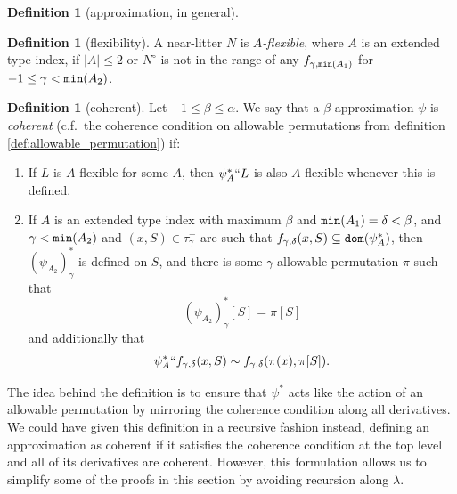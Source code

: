 \documentclass{article}
\theoremstyle{definition}
\newtheorem{definition}[theorem]{Definition}
\theoremstyle{remark}
\begin{document}
{\begin{definition}[approximation, in general]
\begin{enumerate}
  \end{enumerate}
\end{definition}
\begin{definition}[flexibility]\label{def:flexible}
  A near-litter $N$ is {\em  $A$-flexible\/}, where $A$ is an extended type index,  if $|A| \leq 2$ or $N^\circ$ is not in the range of any $f_{\gamma,{\tt min}(A_1)}$
for $-1 \leq \gamma<{\tt min}(A_2)$.
\end{definition}
\begin{definition}[coherent]\label{def:coherent}
  Let $-1 \leq \beta \leq \alpha$.
  We say that a $\beta$-approximation $\psi$ is {\em coherent\/} (c.f.\ the coherence condition on allowable permutations from definition \ref{def:allowable_permutation}) if:
  \begin{enumerate}
    \item If $L$ is $A$-flexible for some $A$, then $\psi_A^*`` L$ is also $A$-flexible whenever this is defined.
    \item If $A$ is an extended type index with maximum $\beta$ and ${\tt min}(A_1) = \delta < \beta$, and $\gamma < {\tt min}(A_2)$ and $(x, S) \in \tau_\gamma^+$ are such that $f_{\gamma,\delta}(x, S) \subseteq {\tt dom}(\psi_A^*)$, then \( (\psi_{A_2})_\gamma^* \) is defined on \( S \), and there is some $\gamma$-allowable permutation $\pi$ such that
    $$ (\psi_{A_2})_\gamma^*[S] = \pi[S] $$
    and additionally that
    $$ \psi_A^* `` f_{\gamma,\delta}(x, S) \sim f_{\gamma,\delta}(\pi(x), \pi[S]). $$
  \end{enumerate}
\end{definition}
The idea behind the definition is to ensure that $\psi^*$ acts like the action of an allowable permutation by mirroring the coherence condition along all derivatives.
We could have given this definition in a recursive fashion instead, defining an approximation as coherent if it satisfies the coherence condition at the top level and all of its derivatives are coherent.
However, this formulation allows us to simplify some of the proofs in this section by avoiding recursion along $\lambda$.

}
\end{document}
